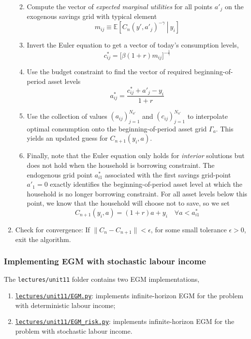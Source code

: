 \documentclass{scrartcl}
\providecommand{\tightlist}{%
      \setlength{\itemsep}{0pt}\setlength{\parskip}{0pt}}
\begin{document}
\begin{enumerate}
  \begin{enumerate}
  \def\labelenumii{\arabic{enumii}.}
  \tightlist
  \item
    Compute the vector of \emph{expected marginal utilities} for all
    points \(a'_j\) on the exogenous savings grid with typical element
    \[m_{ij} \equiv \mathbb{E}\left[\left.C_n\left(y',a'_j\right)^{-\gamma}~\right|~y_i \right]\]
  \item
    Invert the Euler equation to get a vector of today's consumption
    levels, \[
    c^*_{ij} = \bigl[ \beta (1+r) m_{ij} \bigr]^{-\frac{1}{\gamma}}
    \]
  \item
    Use the budget constraint to find the vector of required
    beginning-of-period asset levels \[
    a_{ij}^* = \frac{c_{ij}^* + a'_j - y_i}{1+r}
    \]
  \item
    Use the collection of values \((a_{ij})_{j=1}^{N_{a'}}\) and
    \((c_{ij})_{j=1}^{N_{a'}}\) to interpolate optimal consumption onto
    the beginning-of-period asset grid \(\Gamma_a\). This yields an
    updated guess for \(C_{n+1}(y_i,a)\).
  \item
    Finally, note that the Euler equation only holds for \emph{interior}
    solutions but does not hold when the household is borrowing
    constraint. The endogenous grid point \(a_{i1}^*\) associated with
    the first savings grid-point \(a'_{1} = 0\) exactly identifies the
    beginning-of-period asset level at which the household is no longer
    borrowing constraint. For all asset levels below this point, we know
    that the household will choose not to save, so we set
    \[C_{n+1}(y_i,a) = (1+r)a + y_i \quad \forall a < a_{i1}^*\]
  \end{enumerate}
\item
  Check for convergence: If \(\|C_n-C_{n+1}\| < \epsilon\), for some
  small tolerance \(\epsilon > 0\), exit the algorithm.
\end{enumerate}

    \hypertarget{implementing-egm-with-stochastic-labour-income}{%
\subsubsection*{Implementing EGM with stochastic labour
income}\label{implementing-egm-with-stochastic-labour-income}}

The \texttt{lectures/unit11} folder contains two EGM implementations,

\begin{enumerate}
\def\labelenumi{\arabic{enumi}.}
\tightlist
\item
  \href{../lectures/unit11/EGM.py}{\texttt{lectures/unit11/EGM.py}}:
  implements infinite-horizon EGM for the problem with deterministic
  labour income;
\item
  \href{../lectures/unit11/EGM_risk.py}{\texttt{lectures/unit11/EGM\_risk.py}}:
  implements infinite-horizon EGM for the problem with stochastic labour
  income.
\end{enumerate}
\end{document}
